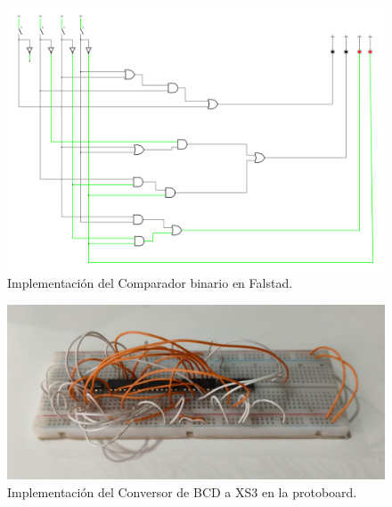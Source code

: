 \documentclass[]{informeutn}
\begin{document}
    \begin{figure}[!ht]
      \centering
      \includegraphics[width=1\textwidth]{images/ej1.png}
      \caption{Implementación del Comparador binario en Falstad.}
      \label{falstad.ej1}
    \end{figure}

    \begin{figure}[!ht]
      \centering
      \includegraphics[width=.8\textwidth]{pictures/prot-ej1.jpeg}
      \caption{Implementación del Conversor de BCD a XS3 en la protoboard.}
      \label{crkt.ej1.prot}
    \end{figure}

    
\end{document}
